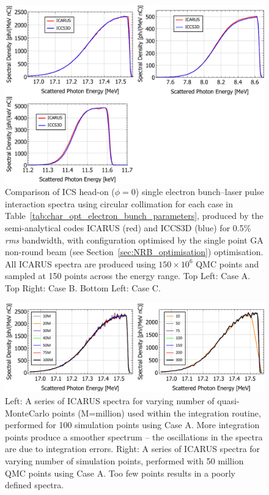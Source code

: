 \documentclass[../main.tex]{subfiles}
\begin{document}
\begin{figure}[!h]
\centering
\includegraphics[width=\textwidth]{Figures/Optimisation_and_Characterisation_of_Inverse_Compton_Scattering_Sources/ICARUS_ICCS3D_cases_comparison.pdf}
\caption{Comparison of ICS head-on ($\phi=0$) single electron bunch--laser pulse interaction spectra using circular collimation for each case in Table~\ref{tab:char_opt_electron_bunch_parameters}, produced by the semi-analytical codes \textsc{ICARUS} (red) and \textsc{ICCS3D} (blue) for 0.5\% \textit{rms} bandwidth, with configuration optimised by the single point GA non-round beam (see Section~\ref{sec:NRB_optimisation}) optimisation. All \textsc{ICARUS} spectra are produced using $150\times 10^{6}$ QMC points and sampled at 150 points across the energy range. Top Left: Case A. Top Right: Case B. Bottom Left: Case C.}
\label{fig:ICARUS_optimised_benchmarking}
\end{figure}

\begin{figure}[!h]
\centering
\includegraphics[width=\textwidth]{Figures/Optimisation_and_Characterisation_of_Inverse_Compton_Scattering_Sources/QMC_SIM_POINT_STUDY.pdf}
\caption{Left: A series of \textsc{ICARUS} spectra for varying number of quasi-MonteCarlo points (M=million) used within the integration routine, performed for 100 simulation points using Case A. More integration points produce a smoother spectrum -- the oscillations in the spectra are due to integration errors. Right: A series of \textsc{ICARUS} spectra for varying number of simulation points, performed with 50 million QMC points using Case A. Too few points results in a poorly defined spectra.}
\label{fig:ICARUS_sim_qmc_points}
\end{figure}
\end{document}
